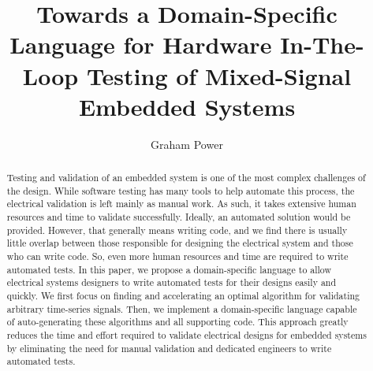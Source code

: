 \documentclass[sigconf,authordraft]{acmart}
\begin{document}
\title{Towards a Domain-Specific Language for Hardware In-The-Loop Testing of Mixed-Signal Embedded Systems}

\author{Graham Power}

\renewcommand{\shortauthors}{Graham Power}

\begin{abstract}
Testing and validation of an embedded system is one of the most complex challenges of the design. While software testing has many tools to help automate this process, the electrical validation is left mainly as manual work. As such, it takes extensive human resources and time to validate successfully.
Ideally, an automated solution would be provided. However, that generally means writing code, and we find there is usually little overlap between those responsible for designing the electrical system and those who can write code. So, even more human resources and time are required to write automated tests.
In this paper, we propose a domain-specific language to allow electrical systems designers to write automated tests for their designs easily and quickly. We first focus on finding and accelerating an optimal algorithm for validating arbitrary time-series signals. Then, we implement a domain-specific language capable of auto-generating these algorithms and all supporting code. This approach greatly reduces the time and effort required to validate electrical designs for embedded systems by eliminating the need for manual validation and dedicated engineers to write automated tests.
\end{abstract}

\end{document}
